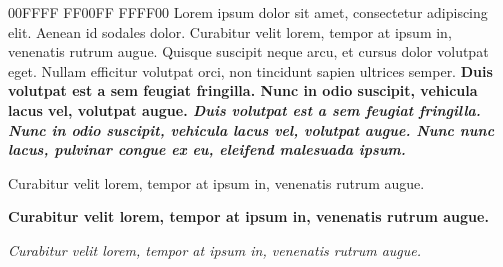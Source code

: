  {00FFFF}
 {FF00FF}
 {FFFF00}
\begindoc
    Lorem ipsum dolor sit amet, consectetur adipiscing elit. Aenean id sodales dolor.
    \linebreak
     {Curabitur velit lorem, tempor at ipsum in, venenatis rutrum augue.}
    \linebreak
    Quisque suscipit neque arcu, et cursus dolor volutpat eget. Nullam efficitur volutpat orci, non tincidunt sapien ultrices semper.
    \bf{Duis volutpat est a sem feugiat fringilla. Nunc in odio suscipit, vehicula lacus vel, volutpat augue.}
    \it{Duis volutpat est a sem feugiat fringilla. Nunc in odio suscipit, vehicula lacus vel, volutpat augue.}
    \linebreak
    \it{Nunc nunc lacus, pulvinar congue ex eu, eleifend malesuada ipsum.}
    \linebreak
    \beginenum
        \item Curabitur velit lorem, tempor at ipsum in, venenatis rutrum augue.
        \item \bf{ {Curabitur velit lorem, tempor at ipsum in, venenatis rutrum augue.}}
        \item \it{Curabitur velit lorem, tempor at ipsum in, venenatis rutrum augue.}
        \item \linebreak
    \endenum
    \linebreak
    \linebreak
\enddoc